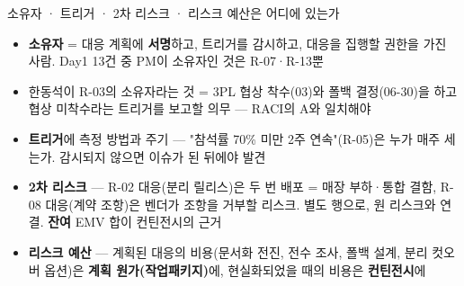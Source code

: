 \begin{frame}{소유자 · 트리거 · 2차 리스크 · 리스크 예산은 어디에 있는가}
\begin{itemize}
\item \textbf{소유자} = 대응 계획에 \textbf{서명}하고, 트리거를 감시하고, 대응을 집행할 권한을 가진 사람. Day1 13건 중 PM이 소유자인 것은 R-07·R-13뿐
\item 한동석이 R-03의 소유자라는 것 = 3PL 협상 착수(03)와 폴백 결정(06-30)을 하고 협상 미착수라는 트리거를 보고할 의무 — RACI의 A와 일치해야
\item \textbf{트리거}에 측정 방법과 주기 — "참석률 70\% 미만 2주 연속"(R-05)은 누가 매주 세는가. 감시되지 않으면 이슈가 된 뒤에야 발견
\item \textbf{2차 리스크} — R-02 대응(분리 릴리스)은 두 번 배포 = 매장 부하·통합 결함, R-08 대응(계약 조항)은 벤더가 조항을 거부할 리스크. 별도 행으로, 원 리스크와 연결. \textbf{잔여} EMV 합이 컨틴전시의 근거
\item \textbf{리스크 예산} — 계획된 대응의 비용(문서화 전진, 전수 조사, 폴백 설계, 분리 컷오버 옵션)은 \textbf{계획 원가(작업패키지)}에, 현실화되었을 때의 비용은 \textbf{컨틴전시}에
\end{itemize}
\end{frame}

